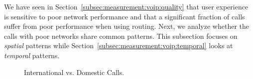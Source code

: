 We have seen in 
Section~\ref{subsec:measurement:voip:quality} that user 
experience is sensitive to poor network performance 
and that a significant fraction of calls suffer from poor 
performance when using \direct routing. 
Next, we analyze whether the calls with poor networks 
share common patterns. This subsection focuses on 
{\em spatial} patterns while
Section~\ref{subsec:measurement:voip:temporal} 
looks at {\em temporal} patterns.


\begin{figure}[t!]
\centering
{}
\caption{International vs. Domestic Calls.}
\label{fig:country}
\end{figure}

